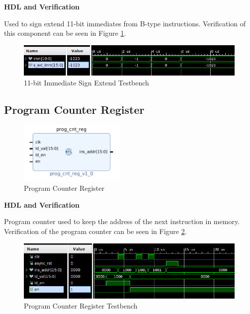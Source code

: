 \documentclass{article}
\newcommand{\stitle}{HDL and Verification}
\begin{document}
\begin{par}
	\textbf{\stitle}
	\begin{par}
		Used to sign extend 11-bit immediates from B-type instructions. Verification of this component can be seen in Figure \ref{fig:immExtTb}.
	\end{par}

	\begin{figure}[H]
		\centering
		\includegraphics[width=5in]{img/immExtTB.png}
		\caption{11-bit Immediate Sign Extend Testbench}
		\label{fig:immExtTb}
	\end{figure}
	
	\newpage
	
	\subsection{Program Counter Register}
	
	\begin{figure}[H]
		\centering
		\includegraphics[width=2in]{img/progCnt.png}
		\caption{Program Counter Register}
	\end{figure}
	
	\textbf{\stitle}
	\begin{par}
		Program counter used to keep the address of the next instruction in memory. Verification of the program counter can be seen in Figure \ref{fig:progcnttb}.
	\end{par}
	
	\begin{figure}[H]
		\centering
		\includegraphics[width=6in]{img/progCntTB.png}
		\caption{Program Counter Register Testbench}
		\label{fig:progcnttb}
	\end{figure}


\end{par}
\end{document}

